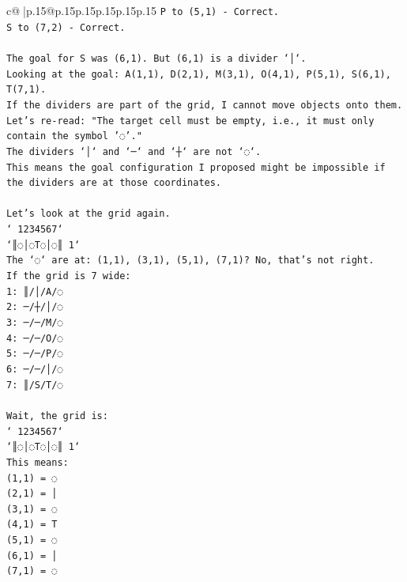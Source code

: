 \documentclass{article}
\begin{document}
{\begin{supertabular}{c@{$\;$}|p{.15\linewidth}@{}p{.15\linewidth}p{.15\linewidth}p{.15\linewidth}p{.15\linewidth}p{.15\linewidth}}
{{{\texttt{P to (5,1) {-} Correct.} \\
\texttt{S to (7,2) {-} Correct.} \\
\\ 
\texttt{The goal for S was (6,1). But (6,1) is a divider `│`.} \\
\texttt{Looking at the goal: A(1,1), D(2,1), M(3,1), O(4,1), P(5,1), S(6,1), T(7,1).} \\
\texttt{If the dividers are part of the grid, I cannot move objects onto them.} \\
\texttt{Let's re{-}read: "The target cell must be empty, i.e., it must only contain the symbol '◌'."} \\
\texttt{The dividers `│` and `─` and `┼` are not `◌`.} \\
\texttt{This means the goal configuration I proposed might be impossible if the dividers are at those coordinates.} \\
\\ 
\texttt{Let's look at the grid again.} \\
\texttt{` 1234567`} \\
\texttt{`║◌│◌T◌│◌║ 1`} \\
\texttt{The `◌` are at: (1,1), (3,1), (5,1), (7,1)? No, that's not right.} \\
\texttt{If the grid is 7 wide:} \\
\texttt{1: ║/│/A/◌} \\
\texttt{2: ─/┼/│/◌} \\
\texttt{3: ─/─/M/◌} \\
\texttt{4: ─/─/O/◌} \\
\texttt{5: ─/─/P/◌} \\
\texttt{6: ─/─/│/◌} \\
\texttt{7: ║/S/T/◌} \\
\\ 
\texttt{Wait, the grid is:} \\
\texttt{` 1234567`} \\
\texttt{`║◌│◌T◌│◌║ 1`} \\
\texttt{This means:} \\
\texttt{(1,1) = ◌} \\
\texttt{(2,1) = │} \\
\texttt{(3,1) = ◌} \\
\texttt{(4,1) = T} \\
\texttt{(5,1) = ◌} \\
\texttt{(6,1) = │} \\
\texttt{(7,1) = ◌} \\
\\ 
}}}
\end{supertabular}}
\end{document}

